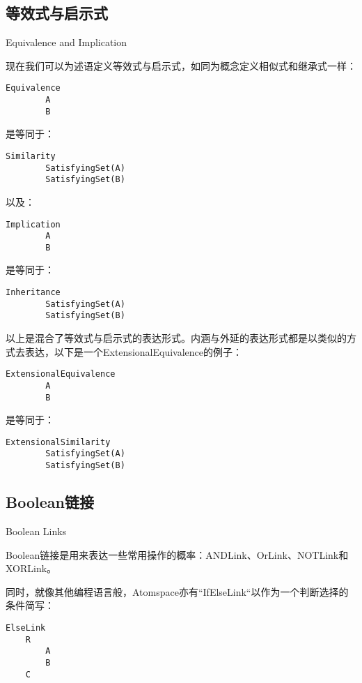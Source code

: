\subsection{等效式与启示式}{Equivalence and Implication}

现在我们可以为述语定义等效式与启示式，如同为概念定义相似式和继承式一样：

\begin{verbatim}
Equivalence
        A
        B
\end{verbatim}

是等同于：

\begin{verbatim}
Similarity
        SatisfyingSet(A)
        SatisfyingSet(B)
\end{verbatim}

以及：

\begin{verbatim}
Implication
        A
        B
\end{verbatim}

是等同于：

\begin{verbatim}
Inheritance
        SatisfyingSet(A)
        SatisfyingSet(B)
\end{verbatim}

以上是混合了等效式与启示式的表达形式。内涵与外延的表达形式都是以类似的方式去表达，以下是一个ExtensionalEquivalence的例子：

\begin{verbatim}
ExtensionalEquivalence
        A
        B
\end{verbatim}

是等同于：

\begin{verbatim}
ExtensionalSimilarity
        SatisfyingSet(A)
        SatisfyingSet(B)
\end{verbatim}

\subsection{Boolean链接}{Boolean Links}

Boolean链接是用来表达一些常用操作的概率：ANDLink、OrLink、NOTLink和XORLink。

同时，就像其他编程语言般，Atomspace亦有“IfElseLink“以作为一个判断选择的条件简写：

\begin{verbatim}
ElseLink
	R
		A
		B
	C
\end{verbatim}

